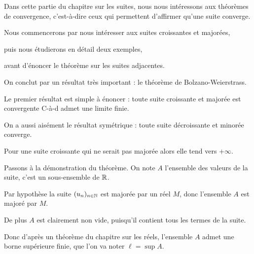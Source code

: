 







\debuttexte

\diapo

\change

Dans cette partie du chapitre sur les suites, nous nous intéressons aux théorèmes 
de convergence, c'est-à-dire ceux qui permettent d'affirmer qu'une suite converge.

\change

Nous commencerons par nous intéresser aux suites croissantes et majorées,

\change

puis nous étudierons en détail deux exemples,

\change

avant d'énoncer le théorème sur les suites adjacentes.


\change


On conclut par un résultat très important : le théorème de Bolzano-Weierstrass.


 \diapo

Le premier résultat est simple à énoncer : 
toute suite croissante et majorée est convergente
C-à-d admet une limite finie.

\change

On a aussi aisément le résultat symétrique : 
toute suite décroissante et minorée converge.

\change

Pour une suite croissante qui ne serait pas majorée alors elle tend vers $+\infty$.

\change

Passons à la démonstration du théorème. On note $A$ 
l'ensemble des valeurs de la suite, c'est un sous-ensemble de $\mathbb{R}$. 

\change

Par hypothèse la suite $(u_n)_{n\in \mathbb{N}}$ 
est majorée par un réel $M$, donc l'ensemble $A$ est majoré par $M$.

\change

De plus $A$ est clairement non vide, 
puisqu'il contient tous les termes de la suite.

Donc d'après un théorème du chapitre sur les réels, 
l'ensemble $A$ admet une borne supérieure finie, que l'on va noter $\ell=\sup A$. 

